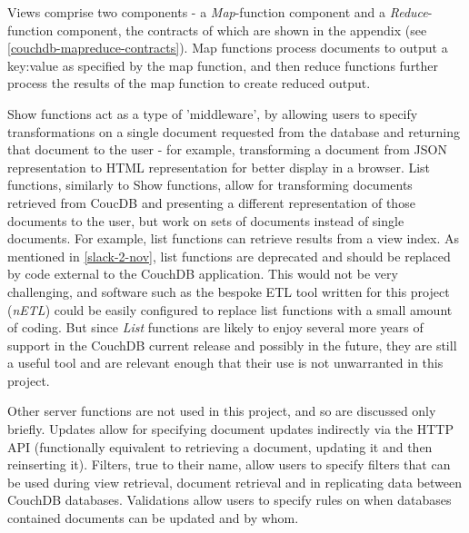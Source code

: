 Views comprise two components - a \textit{Map}-function component and a \textit{Reduce}-function component, the contracts of which are shown in the appendix (see \ref{couchdb-mapreduce-contracts}). Map functions process documents to output a key:value as specified by the map function, and then reduce functions further process the results of the map function to create reduced output.

Show functions act as a type of 'middleware', by allowing users to specify transformations on a single document requested from the database and returning that document to the user - for example, transforming a document from JSON representation to HTML representation for better display in a browser. List functions, similarly to Show functions, allow for transforming documents retrieved from CoucDB and presenting a different representation of those documents to the user, but work on sets of documents instead of single documents. For example, list functions can retrieve results from a view index. As mentioned in \ref{slack-2-nov}, list functions are deprecated and should be replaced by code external to the CouchDB application. This would not be very challenging, and software such as the bespoke ETL tool written for this project (\textit{nETL}) could be easily configured to replace list functions with a small amount of coding. But since \textit{List} functions are likely to enjoy several more years of support in the CouchDB current release and possibly in the future, they are still a useful tool and are relevant enough that their use is not unwarranted in this project.

Other server functions are not used in this project, and so are discussed only briefly. Updates allow for specifying document updates indirectly via the HTTP API (functionally equivalent to retrieving a document, updating it and then reinserting it). Filters, true to their name, allow users to specify filters that can be used during view retrieval, document retrieval and in replicating data between CouchDB databases. Validations allow users to specify rules on when databases contained documents can be updated and by whom.

